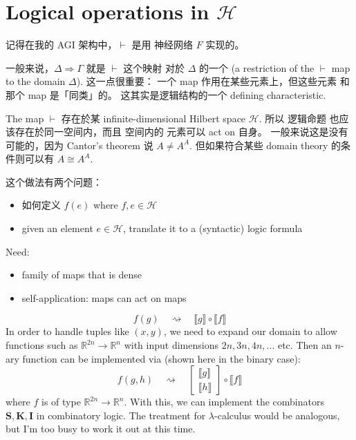 \section{Logical operations in $\mathcal{H}$}

记得在我的 AGI 架构中，$\vdash$ 是用 神经网络 $F$ 实现的。 

一般来说，$\Delta \Rightarrow \Gamma$ 就是 $\vdash$ 这个映射 对於 $\Delta$ 的一个  (a restriction of the $\vdash$ map to the domain $\Delta$).  这一点很重要： 一个 map 作用在某些元素上，但这些元素 和那个 map 是「同类」的。 这其实是逻辑结构的一个 defining characteristic.

The map $\vdash$ 存在於某 infinite-dimensional Hilbert space $\mathcal{H}$.  所以 逻辑命题 也应该存在於同一空间内，而且 空间内的 元素可以 act on 自身。 一般来说这是没有可能的，因为 Cantor's theorem 说 $A \neq A^A$.  但如果符合某些 domain theory 的条件则可以有 $A \cong A^A$.

这个做法有两个问题：
\begin{itemize}
	\item 如何定义 $f(e)$ where $f, e \in \mathcal{H}$
	\item given an element $e \in \mathcal{H}$, translate it to a (syntactic) logic formula
\end{itemize}

Need:
\begin{itemize}
	\item family of maps that is dense
	\item self-application:  maps can act on maps
\end{itemize}

\begin{equation}
f(g) \quad  \rightsquigarrow \quad \llbracket g \rrbracket \circ \llbracket f \rrbracket
\end{equation}
In order to handle tuples like $(x,y)$, we need to expand our domain to allow functions such as $\mathbb{R}^{2n} \rightarrow \mathbb{R}^n$ with input dimensions $2n, 3n, 4n, ...$ etc.  Then an $n$-ary function can be implemented via (shown here in the binary case):
\begin{equation}
f(g, h) \quad \rightsquigarrow \quad
\begin{bmatrix}
\llbracket g \rrbracket \\
\llbracket h \rrbracket
\end{bmatrix} \circ \llbracket f \rrbracket
\end{equation}
where $f$ is of type $\mathbb{R}^{2n} \rightarrow \mathbb{R}^n$.  With this, we can implement the combinators $\mathbf{S}, \mathbf{K}, \mathbf{I}$ in combinatory logic.  The treatment for $\lambda$-calculus would be analogous, but I'm too busy to work it out at this time.

